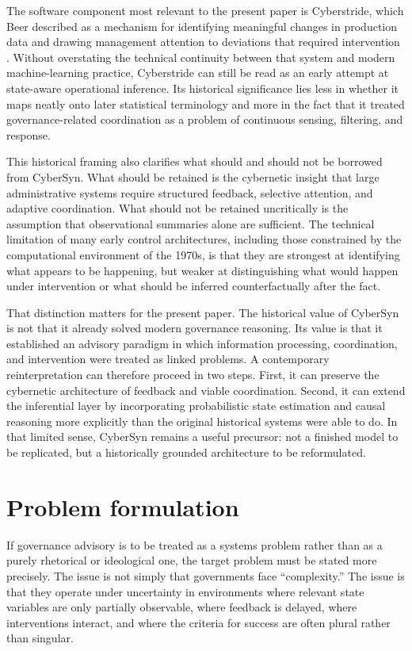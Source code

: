 \documentclass[11pt]{article}
\begin{document}
The software component most relevant to the present paper is Cyberstride, which Beer described as a mechanism for identifying meaningful changes in production data and drawing management attention to deviations that required intervention \citep{beer1972, medina2014}. Without overstating the technical continuity between that system and modern machine-learning practice, Cyberstride can still be read as an early attempt at state-aware operational inference. Its historical significance lies less in whether it maps neatly onto later statistical terminology and more in the fact that it treated governance-related coordination as a problem of continuous sensing, filtering, and response.

This historical framing also clarifies what should and should not be borrowed from CyberSyn. What should be retained is the cybernetic insight that large administrative systems require structured feedback, selective attention, and adaptive coordination. What should not be retained uncritically is the assumption that observational summaries alone are sufficient. The technical limitation of many early control architectures, including those constrained by the computational environment of the 1970s, is that they are strongest at identifying what appears to be happening, but weaker at distinguishing what would happen under intervention or what should be inferred counterfactually after the fact.

That distinction matters for the present paper. The historical value of CyberSyn is not that it already solved modern governance reasoning. Its value is that it established an advisory paradigm in which information processing, coordination, and intervention were treated as linked problems. A contemporary reinterpretation can therefore proceed in two steps. First, it can preserve the cybernetic architecture of feedback and viable coordination. Second, it can extend the inferential layer by incorporating probabilistic state estimation and causal reasoning more explicitly than the original historical systems were able to do. In that limited sense, CyberSyn remains a useful precursor: not a finished model to be replicated, but a historically grounded architecture to be reformulated.

\section{Problem formulation}

If governance advisory is to be treated as a systems problem rather than as a purely rhetorical or ideological one, the target problem must be stated more precisely. The issue is not simply that governments face ``complexity.'' The issue is that they operate under uncertainty in environments where relevant state variables are only partially observable, where feedback is delayed, where interventions interact, and where the criteria for success are often plural rather than singular.
\end{document}

